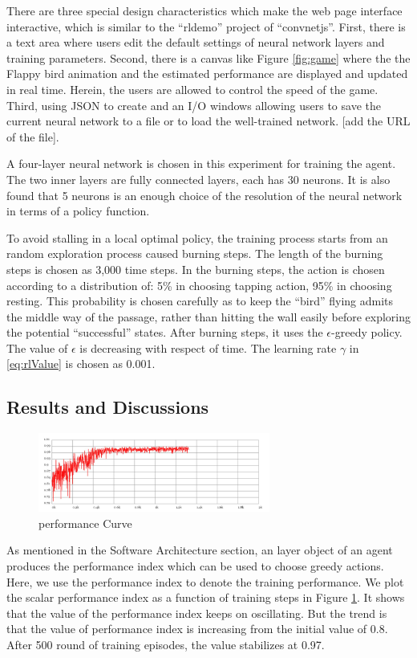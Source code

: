 \documentclass[conference,compsoc]{IEEEtran}
\begin{document}
There are three special design characteristics which make the web page interface interactive, which is similar to the ``rldemo'' project of ``convnetjs''. First, there is a text area where users edit the default settings of neural network layers and training parameters. Second, there is a canvas like Figure \ref{fig:game} where the the Flappy bird animation and the estimated performance are displayed and updated in real time. Herein, the users are allowed to control the speed of the game. Third, using JSON to create and an I/O windows allowing users to save the current neural network to a file or to load the well-trained network. [add the URL of the file]. 

A four-layer neural network is chosen in this experiment for training the agent. The two inner layers are fully connected layers, each has 30 neurons. It is also found that 5 neurons is an enough choice of the resolution of the neural network in terms of a policy function. 

To avoid stalling in a local optimal policy, the training process starts from an random exploration process caused burning steps. The length of the burning steps is chosen as 3,000 time steps. In the burning steps, the action is chosen according to a distribution of: 5\% in choosing tapping action, 95\% in choosing resting. This probability is chosen carefully as to keep the ``bird'' flying admits the middle way of the passage, rather than hitting the wall easily before exploring the potential ``successful'' states. After burning steps, it uses the $\epsilon$-greedy policy. The value of $\epsilon$ is decreasing with respect of time. The learning rate $\gamma$ in \eqref{eq:rlValue} is chosen as 0.001. 

\subsection{Results and Discussions}
\begin{figure}[!t]
\centering
\includegraphics[width=3in]{performanceCurve.jpeg}
\caption{performance Curve}
\label{fig:performanceCurve}
\end{figure}
As mentioned in the Software Architecture section, an layer object of an agent produces the performance index which can be used to choose greedy actions. Here, we use the performance index to denote the training performance. We plot the scalar performance index as a function of training steps in Figure \ref{fig:performanceCurve}. It shows that the value of the performance index keeps on oscillating. But the trend is that the value of performance index is increasing from the initial value of 0.8. After 500 round of training episodes, the value stabilizes at 0.97. 
\end{document}
